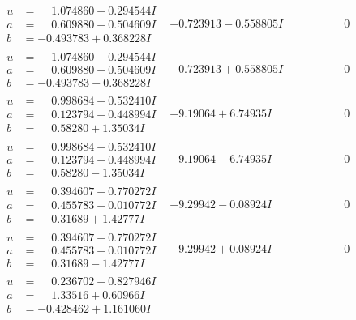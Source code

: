 \documentclass[1p]{elsarticle_modified}
\theoremstyle{definition}
\begin{document}
$$\begin{array}{c|c|c}
\begin{aligned}
u &= \phantom{-}1.074860 + 0.294544 I \\
a &= \phantom{-}0.609880 + 0.504609 I \\
b &= -0.493783 + 0.368228 I\end{aligned}
 & -0.723913 - 0.558805 I & \phantom{-0.000000 } 0 \\ \hline\begin{aligned}
u &= \phantom{-}1.074860 - 0.294544 I \\
a &= \phantom{-}0.609880 - 0.504609 I \\
b &= -0.493783 - 0.368228 I\end{aligned}
 & -0.723913 + 0.558805 I & \phantom{-0.000000 } 0 \\ \hline\begin{aligned}
u &= \phantom{-}0.998684 + 0.532410 I \\
a &= \phantom{-}0.123794 + 0.448994 I \\
b &= \phantom{-}0.58280 + 1.35034 I\end{aligned}
 & -9.19064 + 6.74935 I & \phantom{-0.000000 } 0 \\ \hline\begin{aligned}
u &= \phantom{-}0.998684 - 0.532410 I \\
a &= \phantom{-}0.123794 - 0.448994 I \\
b &= \phantom{-}0.58280 - 1.35034 I\end{aligned}
 & -9.19064 - 6.74935 I & \phantom{-0.000000 } 0 \\ \hline\begin{aligned}
u &= \phantom{-}0.394607 + 0.770272 I \\
a &= \phantom{-}0.455783 + 0.010772 I \\
b &= \phantom{-}0.31689 + 1.42777 I\end{aligned}
 & -9.29942 - 0.08924 I & \phantom{-0.000000 } 0 \\ \hline\begin{aligned}
u &= \phantom{-}0.394607 - 0.770272 I \\
a &= \phantom{-}0.455783 - 0.010772 I \\
b &= \phantom{-}0.31689 - 1.42777 I\end{aligned}
 & -9.29942 + 0.08924 I & \phantom{-0.000000 } 0 \\ \hline\begin{aligned}
u &= \phantom{-}0.236702 + 0.827946 I \\
a &= \phantom{-}1.33516 + 0.60966 I \\
b &= -0.428462 + 1.161060 I\end{aligned}

\end{array}$$
\end{document}
